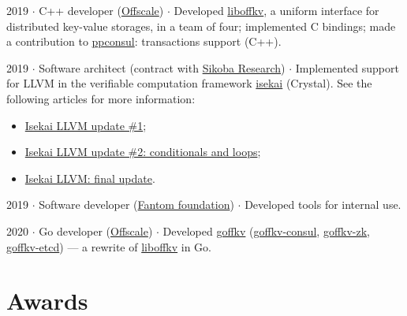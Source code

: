 \documentclass[10pt]{article}
\begin{document}
\medskip

2019 $\cdot$ C++ developer (\href{https://offscale.io}{Offscale}) $\cdot$ Developed \href{https://github.com/offscale/liboffkv}{liboffkv}, a uniform interface for distributed key-value storages, in a team of four; implemented C bindings; made a contribution to \href{https://github.com/oliora/ppconsul}{ppconsul}: transactions support (C++).

\medskip

2019 $\cdot$ Software architect (contract with \href{https://research.sikoba.com}{Sikoba Research}) $\cdot$ Implemented support for LLVM in the verifiable computation framework \href{https://github.com/sikoba/isekai}{isekai} (Crystal).
See the following articles for more information:
\begin{itemize}
    \item \href{https://medium.com/sikoba-network/isekai-technical-update-llvm-d5003fc8f009}{Isekai LLVM update \#1};
    \item \href{https://medium.com/sikoba-network/isekai-llvm-update-2-conditionals-and-loops-81296a0eccbf}{Isekai LLVM update \#2: conditionals and loops};
    \item \href{https://medium.com/sikoba-network/isekai-llvm-final-update-894fb6863fcf}{Isekai LLVM: final update}.
\end{itemize}

\medskip

2019 $\cdot$ Software developer (\href{https://fantom.foundation}{Fantom foundation}) $\cdot$ Developed tools for internal use.

\medskip

2020 $\cdot$ Go developer (\href{https://offscale.io}{Offscale}) $\cdot$ Developed
\href{https://github.com/offscale/goffkv}{goffkv}
(\href{https://github.com/offscale/goffkv-consul}{goffkv-consul},
\href{https://github.com/offscale/goffkv-zk}{goffkv-zk},
\href{https://github.com/offscale/goffkv-etcd}{goffkv-etcd}) ---
a rewrite of \href{https://github.com/offscale/liboffkv}{liboffkv} in Go.

\medskip

\section{Awards}
\end{document}
